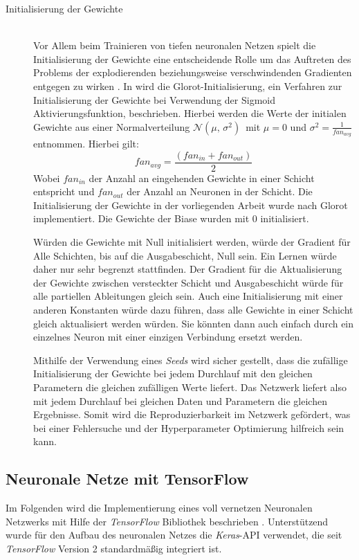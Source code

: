 \begin{description}
	\item[Initialisierung der Gewichte]\hfill \\
	Vor Allem beim Trainieren von tiefen neuronalen Netzen spielt die Initialisierung der Gewichte eine entscheidende Rolle um das Auftreten des Problems der explodierenden beziehungsweise verschwindenden Gradienten entgegen zu wirken \cite{geron2017hands-on}. In \cite{Glorot10understandingthe} wird die Glorot-Initialisierung, ein Verfahren zur Initialisierung der Gewichte bei Verwendung der Sigmoid Aktivierungsfunktion, beschrieben. Hierbei werden die Werte der initialen Gewichte aus einer Normalverteilung $\mathcal{N}(\mu,\,\sigma^{2})\,$ mit $\mu = 0$ und $\sigma^{2}=\frac{1}{fan_{avg}}$ entnommen. Hierbei gilt: 
	\[
	fan_{avg}=\frac{(fan_{in}+fan_{out})}{2}
	\]
	Wobei $fan_{in}$ der Anzahl an eingehenden Gewichte in einer Schicht entspricht und  $fan_{out}$ der Anzahl an Neuronen in der Schicht. Die Initialisierung der Gewichte in der vorliegenden Arbeit wurde  nach Glorot implementiert. Die Gewichte der Biase wurden mit 0 initialisiert.

	Würden die Gewichte mit Null initialisiert werden, würde der Gradient für Alle Schichten, bis auf die Ausgabeschicht, Null sein. Ein Lernen würde daher nur sehr begrenzt stattfinden. Der Gradient für die Aktualisierung der Gewichte zwischen versteckter Schicht und Ausgabeschicht würde für alle partiellen Ableitungen gleich sein. Auch eine Initialisierung mit einer anderen Konstanten würde dazu führen, dass alle Gewichte in einer Schicht gleich aktualisiert werden würden. Sie könnten dann auch einfach durch ein einzelnes Neuron mit einer einzigen Verbindung ersetzt werden.
	
	Mithilfe der Verwendung eines \emph{Seeds} wird sicher gestellt, dass die zufällige Initialisierung der Gewichte bei jedem Durchlauf mit den gleichen Parametern die gleichen zufälligen Werte liefert. Das Netzwerk liefert also mit jedem Durchlauf bei gleichen Daten und Parametern die gleichen Ergebnisse. Somit wird die Reproduzierbarkeit im Netzwerk gefördert, was bei einer Fehlersuche und der Hyperparameter Optimierung hilfreich sein kann.
	
\end{description}
\subsection{Neuronale Netze mit TensorFlow}
Im Folgenden wird die Implementierung eines voll vernetzen Neuronalen Netzwerks mit Hilfe der \emph{TensorFlow} Bibliothek beschrieben \cite{tensorflow2015-whitepaper}. Unterstützend wurde für den Aufbau des neuronalen Netzes die \emph{Keras}-API verwendet, die seit \emph{TensorFlow} Version 2 standardmäßig integriert ist. 

